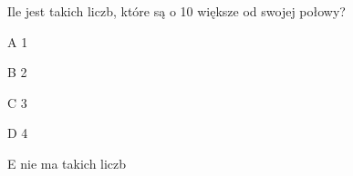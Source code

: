 \begin{tresc}
Ile jest takich liczb, które są o 10 większe od swojej połowy?
\end{tresc}
\begin{wariant}{A} 1 \end{wariant}
\begin{wariant}{B} 2 \end{wariant}
\begin{wariant}{C} 3 \end{wariant}
\begin{wariant}{D} 4 \end{wariant}
\begin{wariant}{E} nie ma takich liczb \end{wariant}
